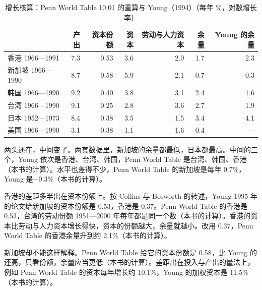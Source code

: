 \begin{table}[tbp]
\centering\small
\caption{增长核算：Penn World Table 10.01 的重算与 Young（1994）（每年 \%，对数增长率）}\label{tab:eastasia-accounting}
\begin{tabularx}{\linewidth}{@{}Y r r r r r r@{}}
\toprule
 & 产出 & 资本份额 & 资本 & 劳动与人力资本 & 余量 & Young 的余量 \\
\midrule
香港 1966—1991 & 7.3 & 0.53 & 3.6 & 2.0 & 1.7 & 2.3 \\
新加坡 1966—1990 & 8.7 & 0.58 & 5.9 & 2.1 & 0.7 & $-0.3$ \\
韩国 1966—1990 & 9.2 & 0.40 & 3.8 & 3.1 & 2.4 & 1.6 \\
台湾 1966—1990 & 9.1 & 0.25 & 2.8 & 3.6 & 2.7 & 1.9 \\
日本 1952—1973 & 8.4 & 0.38 & 3.5 & 1.5 & 3.4 & 4.1 \\
美国 1966—1990 & 3.1 & 0.38 & 1.1 & 1.6 & 0.4 & — \\
\bottomrule
\end{tabularx}
\end{table}

两头还在，中间变了。两套数据里，新加坡的余量都最低，日本都最高\cite{young1994,pwt1001}。中间的三个，Young 依次是香港、台湾、韩国，Penn World Table 是台湾、韩国、香港（本书的计算）。水平也差得不少，Penn World Table 的新加坡是每年 0.7\%，Young 是$-0.3\%$（本书的计算）。

香港的差距多半出在资本份额上。按 Collins 与 Bosworth 的转述，Young 1995 年的论文给新加坡的资本份额是 0.53，香港是 0.37\cite{collinsbosworth1996}。Penn World Table 的香港是 0.53，台湾的劳动份额 1951—2000 年每年都是同一个数（本书的计算）\cite{pwt1001}。香港的资本比劳动与人力资本增长得快，资本的份额越大，余量就越小。改用 0.37，Penn World Table 的香港余量升到约 2.1\%（本书的计算）。

新加坡却不能这样解释。Penn World Table 给它的资本份额是 0.58，比 Young 的还高，只看份额，余量应当更低（本书的计算）。差距出在投入与产出的量法上，例如 Penn World Table 的资本每年增长约 10.1\%，Young 的加权资本是 11.5\%（本书的计算）\cite{young1994}。

